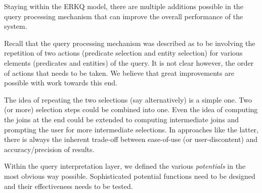 \documentclass[a4paper, twoside, 12pt]{report}
\begin{document}
Staying within the ERKQ model, there are multiple additions possible in the query processing mechanism that can improve the overall performance of the system. 

Recall that the query processing mechanism was described as to be involving the repetition of two actions (predicate selection and entity selection) for various elements (predicates and entities) of the query. It is not clear however, the order of actions that needs to be taken. We believe that great improvements are possible with work towards this end.

The idea of repeating the two selections (say alternatively) is a simple one. Two (or more) selection steps could be combined into one. Even the idea of computing the joins at the end could be extended to computing intermediate joins and prompting the user for more intermediate selections. In approaches like the latter, there is always the inherent trade-off between ease-of-use (or user-discontent) and accuracy/precision of results.

Within the query interpretation layer, we defined the various \emph{potentials} in the most obvious way possible. Sophisticated potential functions need to be designed and their effectiveness needs to be tested.



\end{document}
